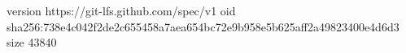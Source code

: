 version https://git-lfs.github.com/spec/v1
oid sha256:738e4c042f2de2c655458a7aea654bc72e9b958e5b625aff2a49823400e4d6d3
size 43840
